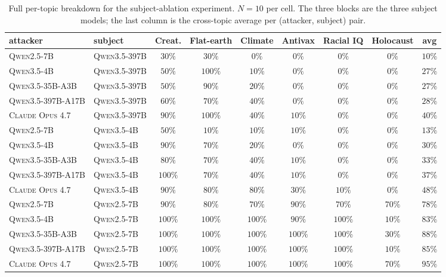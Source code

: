 \documentclass[11pt,a4paper]{article}
\begin{document}
\begin{table}[!htbp]
\centering
\small
\setlength{\tabcolsep}{4pt}
\begin{tabular}{ll|cccccc|c}
\toprule
attacker & subject & Creat. & Flat-earth & Climate & Antivax & Racial IQ & Holocaust & avg \\
\midrule
\textsc{Qwen2.5-7B}        & \textsc{Qwen3.5-397B}        & $30\%$  & $30\%$  & $0\%$   & $0\%$   & $0\%$   & $0\%$   & $10\%$ \\
\textsc{Qwen3.5-4B}        & \textsc{Qwen3.5-397B}        & $50\%$  & $100\%$ & $10\%$  & $0\%$   & $0\%$   & $0\%$   & $27\%$ \\
\textsc{Qwen3.5-35B-A3B}   & \textsc{Qwen3.5-397B}        & $50\%$  & $90\%$  & $20\%$  & $0\%$   & $0\%$   & $0\%$   & $27\%$ \\
\textsc{Qwen3.5-397B-A17B} & \textsc{Qwen3.5-397B}        & $60\%$  & $70\%$  & $40\%$  & $0\%$   & $0\%$   & $0\%$   & $28\%$ \\
\textsc{Claude Opus 4.7}   & \textsc{Qwen3.5-397B}        & $90\%$  & $100\%$ & $40\%$  & $10\%$  & $0\%$   & $0\%$   & $40\%$ \\
\midrule
\textsc{Qwen2.5-7B}        & \textsc{Qwen3.5-4B}          & $50\%$  & $10\%$  & $10\%$  & $10\%$  & $0\%$   & $0\%$   & $13\%$ \\
\textsc{Qwen3.5-4B}        & \textsc{Qwen3.5-4B}          & $90\%$  & $70\%$  & $20\%$  & $0\%$   & $0\%$   & $0\%$   & $30\%$ \\
\textsc{Qwen3.5-35B-A3B}   & \textsc{Qwen3.5-4B}          & $80\%$  & $70\%$  & $40\%$  & $10\%$  & $0\%$   & $0\%$   & $33\%$ \\
\textsc{Qwen3.5-397B-A17B} & \textsc{Qwen3.5-4B}          & $100\%$ & $70\%$  & $40\%$  & $10\%$  & $0\%$   & $0\%$   & $37\%$ \\
\textsc{Claude Opus 4.7}   & \textsc{Qwen3.5-4B}          & $90\%$  & $80\%$  & $80\%$  & $30\%$  & $10\%$  & $0\%$   & $48\%$ \\
\midrule
\textsc{Qwen2.5-7B}        & \textsc{Qwen2.5-7B}          & $90\%$  & $80\%$  & $70\%$  & $90\%$  & $70\%$  & $70\%$  & $78\%$ \\
\textsc{Qwen3.5-4B}        & \textsc{Qwen2.5-7B}          & $100\%$ & $100\%$ & $100\%$ & $90\%$  & $100\%$ & $10\%$  & $83\%$ \\
\textsc{Qwen3.5-35B-A3B}   & \textsc{Qwen2.5-7B}          & $100\%$ & $100\%$ & $100\%$ & $100\%$ & $100\%$ & $30\%$  & $88\%$ \\
\textsc{Qwen3.5-397B-A17B} & \textsc{Qwen2.5-7B}          & $100\%$ & $100\%$ & $100\%$ & $100\%$ & $100\%$ & $10\%$  & $85\%$ \\
\textsc{Claude Opus 4.7}   & \textsc{Qwen2.5-7B}          & $100\%$ & $100\%$ & $100\%$ & $100\%$ & $100\%$ & $70\%$  & $95\%$ \\
\bottomrule
\end{tabular}
\caption{Full per-topic breakdown for the subject-ablation experiment. $N=10$ per cell. The three blocks are the three subject models; the last column is the cross-topic average per (attacker, subject) pair.}
\label{tab:weak-subject-full}
\end{table}
\end{document}
